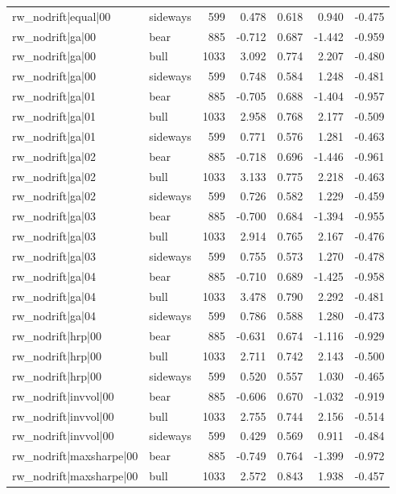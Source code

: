 \begin{table}
\begin{tabular}{llrrrrr}
rw\_nodrift|equal|00 & sideways & 599 & 0.478 & 0.618 & 0.940 & -0.475 \\
rw\_nodrift|ga|00 & bear & 885 & -0.712 & 0.687 & -1.442 & -0.959 \\
rw\_nodrift|ga|00 & bull & 1033 & 3.092 & 0.774 & 2.207 & -0.480 \\
rw\_nodrift|ga|00 & sideways & 599 & 0.748 & 0.584 & 1.248 & -0.481 \\
rw\_nodrift|ga|01 & bear & 885 & -0.705 & 0.688 & -1.404 & -0.957 \\
rw\_nodrift|ga|01 & bull & 1033 & 2.958 & 0.768 & 2.177 & -0.509 \\
rw\_nodrift|ga|01 & sideways & 599 & 0.771 & 0.576 & 1.281 & -0.463 \\
rw\_nodrift|ga|02 & bear & 885 & -0.718 & 0.696 & -1.446 & -0.961 \\
rw\_nodrift|ga|02 & bull & 1033 & 3.133 & 0.775 & 2.218 & -0.463 \\
rw\_nodrift|ga|02 & sideways & 599 & 0.726 & 0.582 & 1.229 & -0.459 \\
rw\_nodrift|ga|03 & bear & 885 & -0.700 & 0.684 & -1.394 & -0.955 \\
rw\_nodrift|ga|03 & bull & 1033 & 2.914 & 0.765 & 2.167 & -0.476 \\
rw\_nodrift|ga|03 & sideways & 599 & 0.755 & 0.573 & 1.270 & -0.478 \\
rw\_nodrift|ga|04 & bear & 885 & -0.710 & 0.689 & -1.425 & -0.958 \\
rw\_nodrift|ga|04 & bull & 1033 & 3.478 & 0.790 & 2.292 & -0.481 \\
rw\_nodrift|ga|04 & sideways & 599 & 0.786 & 0.588 & 1.280 & -0.473 \\
rw\_nodrift|hrp|00 & bear & 885 & -0.631 & 0.674 & -1.116 & -0.929 \\
rw\_nodrift|hrp|00 & bull & 1033 & 2.711 & 0.742 & 2.143 & -0.500 \\
rw\_nodrift|hrp|00 & sideways & 599 & 0.520 & 0.557 & 1.030 & -0.465 \\
rw\_nodrift|invvol|00 & bear & 885 & -0.606 & 0.670 & -1.032 & -0.919 \\
rw\_nodrift|invvol|00 & bull & 1033 & 2.755 & 0.744 & 2.156 & -0.514 \\
rw\_nodrift|invvol|00 & sideways & 599 & 0.429 & 0.569 & 0.911 & -0.484 \\
rw\_nodrift|maxsharpe|00 & bear & 885 & -0.749 & 0.764 & -1.399 & -0.972 \\
rw\_nodrift|maxsharpe|00 & bull & 1033 & 2.572 & 0.843 & 1.938 & -0.457 \\

\end{tabular}
\end{table}

